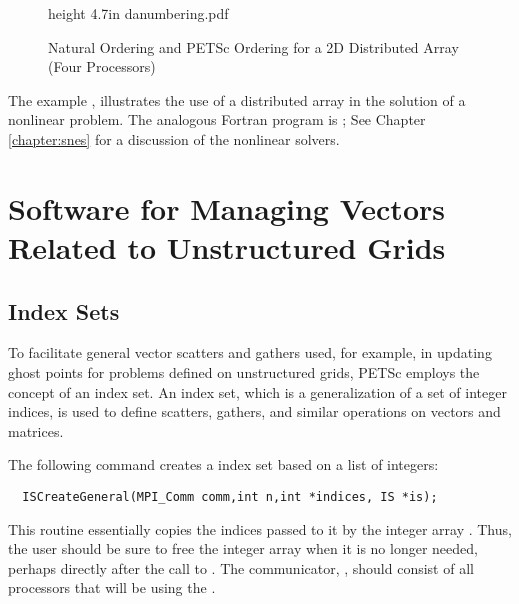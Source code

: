 \begin{figure}[tb]
\centerline{\immediate \pdfximage height 4.7in {danumbering.pdf} \pdfrefximage \pdflastximage}
\caption{Natural Ordering and PETSc Ordering for a 2D Distributed Array (Four Processors)}
\label{fig:daao}
\end{figure}

The example
,
illustrates the use of a distributed array in the solution of
a nonlinear problem.  The analogous Fortran program is
\break {};
See Chapter \ref{chapter:snes} for a discussion of the nonlinear
solvers.


\section{Software for Managing Vectors Related to Unstructured Grids}
\label{sec:unstruct}

\subsection{Index Sets} 
\label{sec:indexset}

To facilitate general vector scatters and gathers used, for example, in updating 
ghost points for problems defined on unstructured grids, PETSc employs the 
concept of an index set.  An index set, which is a generalization of a 
set of integer indices, is used to define scatters, gathers, and similar 
operations on vectors and matrices. 

The following command creates a index set based on a list 
of integers: 
\begin{verbatim}
  ISCreateGeneral(MPI_Comm comm,int n,int *indices, IS *is);
\end{verbatim}
This routine essentially copies the  indices passed 
to it by the integer array .  
Thus, the user should be sure to free the integer array  
when it is no longer needed, perhaps directly after the call to 
. The communicator, , should consist of all 
processors that will be using the .

